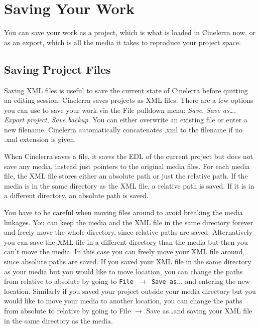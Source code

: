 \section{Saving Your Work}%
\label{sec:saving_your_work}

You can save your work as a project, which is what is loaded in Cinelerra now, or as an export, which is all the media it takes to reproduce your project space.

\subsection{Saving Project Files}%
\label{sub:saving_project_files}

Saving  XML files is useful to save the current state of Cinelerra before quitting an editing session. Cinelerra saves projects as XML files. There are a few options you can use to save your work via the File pulldown menu: \textit{Save}, \textit{Save as\dots}, \textit{Export project}, \textit{Save backup}.  You can either overwrite an existing file or enter a new filename. Cinelerra automatically concatenates .xml to the filename if no .xml extension is given.

When Cinelerra saves a file, it saves the EDL of the current project but does not save any media, instead just pointers to the original media files. For each media file, the XML file stores either an absolute path or just the relative path. If the media is in the same directory as the XML file, a relative path is saved. If it is in a different directory, an absolute path is saved.

You have to be careful when moving files around to avoid breaking the media linkages. You can keep the media and the XML file in the same directory forever and freely move the whole directory, since relative paths are saved. Alternatively you can save the XML file in a different directory than the media but then you can't move the media. In this case you can freely move your XML file around, since absolute paths are saved. If you saved your XML file in the same directory as your media but you would like to move location, you can change the paths from relative to absolute by going
to \texttt{File $\rightarrow$ Save as}$\dots$ and entering the new location. Similarly if you saved your project outside your media directory but you would like to move your media to another location, you can change the paths from absolute to relative by going to File $\rightarrow$ Save as\dots and saving your XML file in the same directory as the media.

